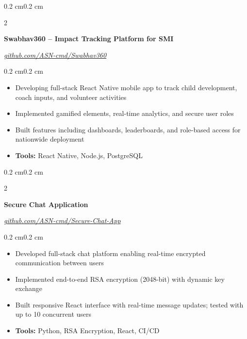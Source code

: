 \documentclass[10pt, letterpaper]{article}
\newenvironment{highlights}{
    \begin{itemize}[
        topsep=0.10 cm,
        parsep=0.10 cm,
        partopsep=0pt,
        itemsep=0pt,
        leftmargin=0.4 cm + 10pt
    ]
}{\end{itemize}}
\newenvironment{onecolentry}{
    \begin{adjustwidth}{0.2 cm}{0.2 cm}
}{\end{adjustwidth}}
\newenvironment{twocolentry}[2][]{
    \onecolentry
    \def\secondColumn{#2}
    \setcolumnwidth{\fill, 4.5 cm}
    \begin{paracol}{2}
}{
    \switchcolumn \raggedleft \secondColumn
    \end{paracol}
    \endonecolentry
}
\begin{document}
    \begin{twocolentry}{
        \textit{\href{https://github.com/ASN-cmd/Swabhav360}{github.com/ASN-cmd/Swabhav360}}
    }
        \textbf{Swabhav360 -- Impact Tracking Platform for SMI}
    \end{twocolentry}
    
    \vspace{0.10 cm}
    \begin{onecolentry}
        \begin{highlights}
            \item Developing full-stack React Native mobile app to track child development, coach inputs, and volunteer activities
            \item Implemented gamified elements, real-time analytics, and secure user roles
            \item Built features including dashboards, leaderboards, and role-based access for nationwide deployment
            \item \textbf{Tools:} React Native, Node.js, PostgreSQL
        \end{highlights}
    \end{onecolentry}

    \vspace{0.2 cm}

    \begin{twocolentry}{
        \textit{\href{https://github.com/ASN-cmd/Secure-Chat-App}{github.com/ASN-cmd/Secure-Chat-App}}
    }
        \textbf{Secure Chat Application}
    \end{twocolentry}
    
    \vspace{0.10 cm}
    \begin{onecolentry}
        \begin{highlights}
            \item Developed full-stack chat platform enabling real-time encrypted communication between users
            \item Implemented end-to-end RSA encryption (2048-bit) with dynamic key exchange
            \item Built responsive React interface with real-time message updates; tested with up to 10 concurrent users
            \item \textbf{Tools:} Python, RSA Encryption, React, CI/CD
        \end{highlights}
    \end{onecolentry}
\end{document}
